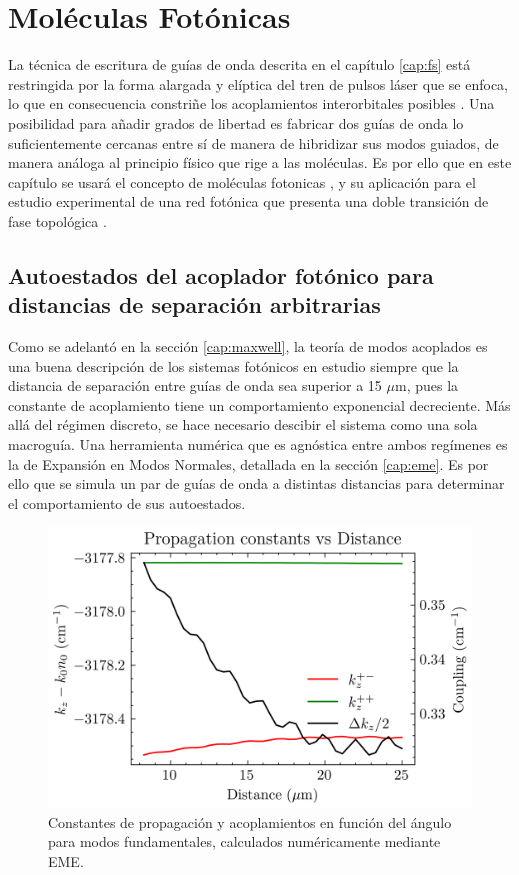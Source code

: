 \chapter{Moléculas Fotónicas}

La técnica de escritura de guías de onda descrita en el capítulo \ref{cap:fs} está restringida por la forma alargada y elíptica del tren de pulsos láser que se enfoca, lo que en consecuencia constriñe los acoplamientos interorbitales posibles \citep{interorbital}. Una posibilidad para añadir grados de libertad es fabricar dos guías de onda lo suficientemente cercanas entre sí de manera de hibridizar sus modos guiados, de manera análoga al principio físico que rige a las moléculas. Es por ello que en este capítulo se usará el concepto de moléculas fotonicas \citep{molecules}, y su aplicación para el estudio experimental de una red fotónica que presenta una doble transición de fase topológica \citep{SPSSH}.

\section{Autoestados del acoplador fotónico para distancias de separación arbitrarias}

Como se adelantó en la sección \ref{cap:maxwell}, la teoría de modos acoplados es una buena descripción de los sistemas fotónicos en estudio siempre que la distancia de separación entre guías de onda sea superior a 15 $\mu$m, pues la constante de acoplamiento tiene un comportamiento exponencial decreciente. Más allá del régimen discreto, se hace necesario descibir el sistema como una sola macroguía. Una herramienta numérica que es agnóstica entre ambos regímenes es la de Expansión en Modos Normales, detallada en la sección \ref{cap:eme}. Es por ello que se simula un par de guías de onda a distintas distancias para determinar el comportamiento de sus autoestados. 

\begin{figure}[H]
	\centering
	\includegraphics[width=0.7\linewidth]{codigo/dimol2/eigenvalues_vs_angle.png}
	\caption[Constantes de propagación y acoplamientos angulares para modos fundamentales]{Constantes de propagación y acoplamientos en función del ángulo para modos fundamentales, calculados numéricamente mediante EME. \label{fig:molecule-coup}}
\end{figure}

